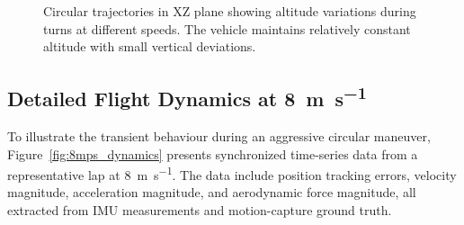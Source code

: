 \begin{figure}[htbp]
  \centering
  \caption{Circular trajectories in XZ plane showing altitude variations during turns at different speeds. The vehicle maintains relatively constant altitude with small vertical deviations.}
  \label{fig:variable_speed_trajectories_xz}
\end{figure}

\subsection{Detailed Flight Dynamics at \SI{8}{\meter\per\second}}\label{sec:8mps-dynamics}

To illustrate the transient behaviour during an aggressive circular maneuver, Figure~\ref{fig:8mps_dynamics} presents synchronized time-series data from a representative lap at \SI{8}{\meter\per\second}.
The data include position tracking errors, velocity magnitude, acceleration magnitude, and aerodynamic force magnitude, all extracted from IMU measurements and motion-capture ground truth.

